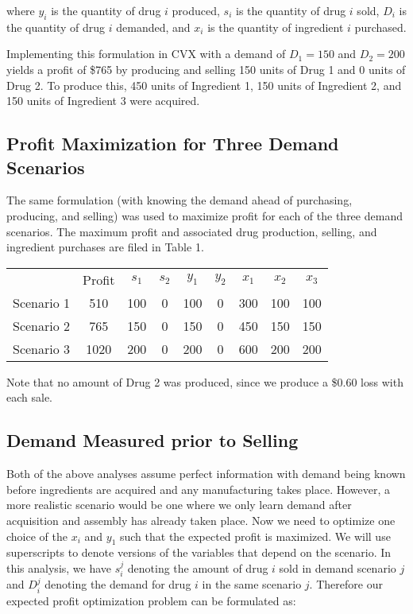 \documentclass[a4paper]{article}
\begin{document}
where $y_i$ is the quantity of drug $i$ produced, $s_i$ is the quantity of drug $i$ sold, $D_i$ is the quantity of drug $i$ demanded, and $x_i$ is the quantity of ingredient $i$ purchased.

Implementing this formulation in CVX with a demand of $D_1 = 150$ and $D_2 = 200$ yields a profit of \$765 by producing and selling 150 units of Drug 1 and 0 units of Drug 2. To produce this, 450 units of Ingredient 1, 150 units of Ingredient 2, and 150 units of Ingredient 3 were acquired.

\subsection{Profit Maximization for Three Demand Scenarios}
The same formulation (with knowing the demand ahead of purchasing, producing, and selling) was used to maximize profit for each of the three demand scenarios. The maximum profit and associated drug production, selling, and ingredient purchases are filed in Table 1.

\begin{tabular}{c  c  c c  c c c c c}
           & Profit & $s_1$ & $s_2$ & $y_1$ & $y_2$ & $x_1$ & $x_2$ & $x_3$ \\
Scenario 1 &  510   & 100   & 0     & 100   & 0     & 300   & 100   & 100   \\
Scenario 2 &  765   & 150   & 0     & 150   & 0     & 450   & 150   & 150   \\
Scenario 3 & 1020   & 200   & 0     & 200   & 0     & 600   & 200   & 200   \\
\end{tabular}

Note that no amount of Drug 2 was produced, since we produce a \$0.60 loss with each sale.

\subsection{Demand Measured prior to Selling}
Both of the above analyses assume perfect information with demand being known before ingredients are acquired and any manufacturing takes place.
However, a more realistic scenario would be one where we only learn demand after acquisition and assembly has already taken place.
Now we need to optimize one choice of the $x_i$ and $y_1$ such that the expected profit is maximized.
We will use superscripts to denote versions of the variables that depend on the scenario.
In this analysis, we have $s_i^j$ denoting the amount of drug $i$ sold in demand scenario $j$ and $D_i^j$ denoting the demand for drug $i$ in the same scenario $j$.
Therefore our expected profit optimization problem can be formulated as:
\end{document}
